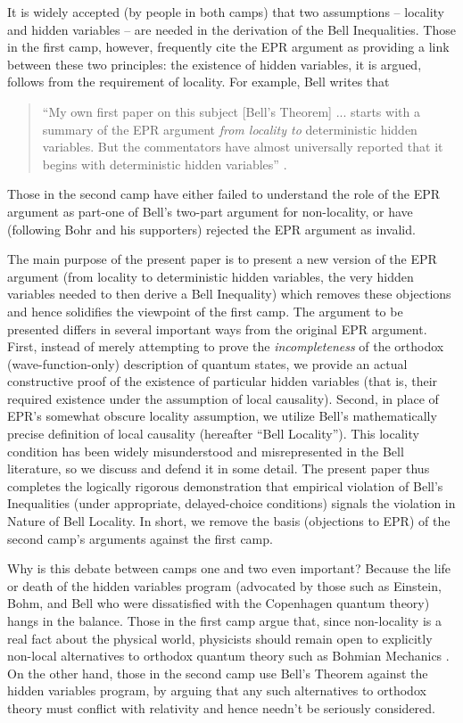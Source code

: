 \documentclass[aps,prc,onecolumn,12pt]{revtex4-2}
\begin{document}
It is widely accepted (by people in both camps) that two assumptions
-- locality and hidden variables -- are needed in the derivation of
the Bell Inequalities.  Those in the first camp, however, frequently
cite the EPR argument \cite{epr} as providing a link between these two
principles:  the existence of hidden variables, it is argued,
follows from the requirement of locality.  For example, Bell writes that
\begin{quote}
``My own first paper on this subject [Bell's Theorem] ...
starts with a summary of the EPR argument \emph{from locality to}
deterministic hidden variables.  But the commentators have almost
universally reported that it begins with deterministic hidden
variables'' \cite[pg 157]{bell}.
\end{quote}
Those in the second camp have either failed to understand the role of
the EPR argument as part-one of Bell's two-part argument for
non-locality, or have (following Bohr and his supporters) rejected the
EPR argument as invalid.

The main purpose of the present paper is to present a new version of
the EPR argument (from locality to deterministic hidden variables, the
very hidden variables needed to then derive a Bell Inequality) which
removes these objections and hence solidifies the viewpoint of the
first camp.  The
argument to be presented differs in several important ways from
the original EPR argument.  First, instead of merely attempting to
prove the \emph{incompleteness} of the orthodox (wave-function-only)
description of quantum states, we provide an actual constructive proof
of the existence of particular hidden variables (that is, their
required existence under the
assumption of local causality).  Second, in place of EPR's somewhat
obscure locality assumption, we utilize Bell's mathematically precise
definition of local causality (hereafter ``Bell Locality'').  This
locality condition has been widely misunderstood and misrepresented in
the Bell literature, so we discuss and defend it in some detail.  The
present paper thus completes the logically rigorous demonstration that
empirical violation of Bell's Inequalities (under appropriate,
delayed-choice conditions) signals the violation in Nature of Bell
Locality.  In short, we remove the basis (objections to EPR) of the
second camp's arguments against the first camp.

Why is this debate between camps one and two even important?
Because the life or
death of the hidden variables program (advocated by those such as
Einstein, Bohm, and Bell who were dissatisfied with the Copenhagen
quantum theory) hangs in the balance.  Those in the first camp
argue that, since non-locality is a real fact about the
physical world, physicists should remain open to
explicitly non-local alternatives to orthodox quantum theory
such as Bohmian Mechanics  \cite{bohmmech}.
On the other hand, those in the second camp use Bell's Theorem against
the hidden variables program, by arguing that any such alternatives to
orthodox theory must conflict with relativity and hence needn't be
seriously considered.
\end{document}
